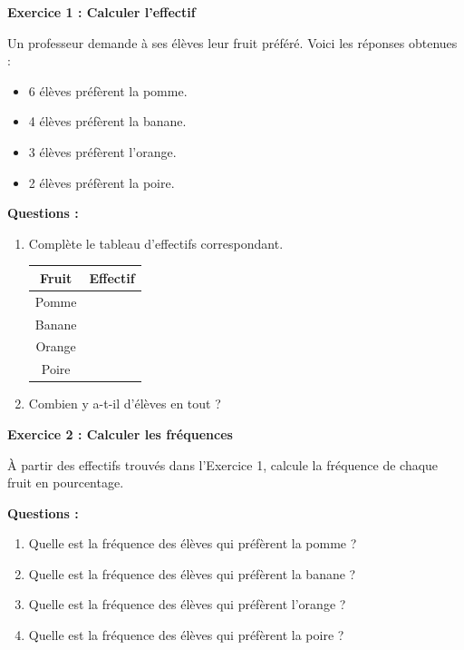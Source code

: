 \documentclass{article}
\begin{document}
\begin{tcolorbox}[colback=green!10!white, colframe=yellow!75!black, title=\textcolor{white}{Exercices}]

\textbf{Exercice 1 : Calculer l'effectif}

Un professeur demande à ses élèves leur fruit préféré. Voici les réponses obtenues :
\begin{itemize}
    \item 6 élèves préfèrent la pomme.
    \item 4 élèves préfèrent la banane.
    \item 3 élèves préfèrent l'orange.
    \item 2 élèves préfèrent la poire.
\end{itemize}

\textbf{Questions :}
\begin{enumerate}
    \item Complète le tableau d'effectifs correspondant.
    
\begin{center}
\begin{tabular}{|c|c|}
\hline
Fruit & Effectif \\
\hline
Pomme &  \\
Banane &  \\
Orange &  \\
Poire &  \\
\hline
\end{tabular}
\end{center}

    \item Combien y a-t-il d'élèves en tout ?
\end{enumerate}

\vspace{0.35cm}

\textbf{Exercice 2 : Calculer les fréquences}

À partir des effectifs trouvés dans l'Exercice 1, calcule la fréquence de chaque fruit en pourcentage.

\textbf{Questions :}
\begin{enumerate}
    \item Quelle est la fréquence des élèves qui préfèrent la pomme ?
    \item Quelle est la fréquence des élèves qui préfèrent la banane ?
    \item Quelle est la fréquence des élèves qui préfèrent l'orange ?
    \item Quelle est la fréquence des élèves qui préfèrent la poire ?
\end{enumerate}


\end{tcolorbox}
\end{document}
